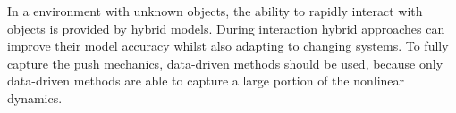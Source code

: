 In a environment with unknown objects, the ability to rapidly interact with objects is provided by hybrid models. During interaction hybrid approaches can improve their model accuracy whilst also adapting to changing systems. To fully capture the push mechanics, data-driven methods should be used, because only data-driven methods are able to capture a large portion of the nonlinear dynamics.

\endgroup

%
%
%

